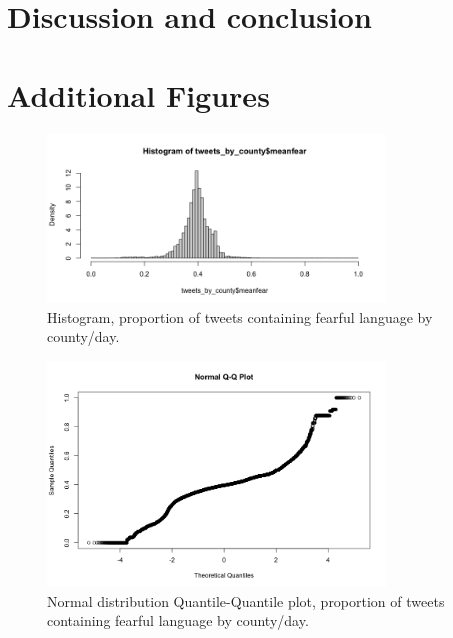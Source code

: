 \documentclass{article}
\begin{document}
\section{Discussion and conclusion} %


\printbibliography
\newpage

\appendix 
\section{Additional Figures} \label{add-figs}
\begin{figure}[h!]
  \includegraphics[width=0.8\textwidth]{figs/n30_hist.png}    
  \centering
  \caption{Histogram, proportion of tweets containing fearful language by county/day.}
  \label{n30_hist}
\end{figure}
\begin{figure}[h!]
  \includegraphics[width=0.8\textwidth]{figs/n30_qplot.png}    
  \centering
  \caption{Normal distribution Quantile-Quantile plot, proportion of tweets containing fearful language by county/day.}
  \label{n30_qplot}
\end{figure}
\end{document}
